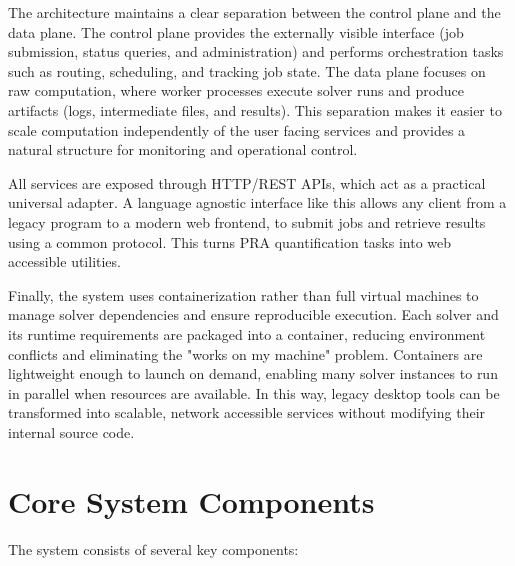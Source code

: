 The architecture maintains a clear separation between the control plane and the data plane. The control plane provides the externally visible interface (job submission, status queries, and administration) and performs orchestration tasks such as routing, scheduling, and tracking job state. The data plane focuses on raw computation, where worker processes execute solver runs and produce artifacts (logs, intermediate files, and results). This separation makes it easier to scale computation independently of the user facing services and provides a natural structure for monitoring and operational control.

All services are exposed through HTTP/REST APIs, which act as a practical universal adapter. A language agnostic interface like this allows any client from a legacy program to a modern web frontend, to submit jobs and retrieve results using a common protocol. This turns PRA quantification tasks into web accessible utilities.

Finally, the system uses containerization rather than full virtual machines to manage solver dependencies and ensure reproducible execution. Each solver and its runtime requirements are packaged into a container, reducing environment conflicts and eliminating the "works on my machine" problem. Containers are lightweight enough to launch on demand, enabling many solver instances to run in parallel when resources are available. In this way, legacy desktop tools can be transformed into scalable, network accessible services without modifying their internal source code.

\section{Core System Components}
The system consists of several key components:

